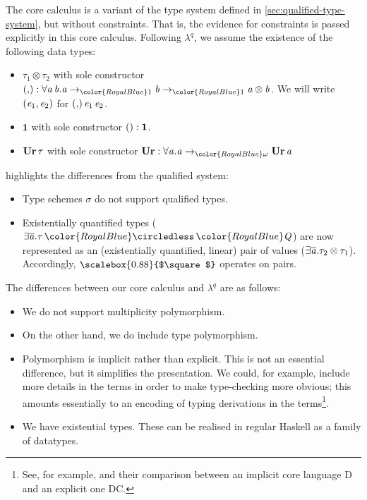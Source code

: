 \documentclass[acmsmall,usenames,dvipsnames,natbib=false,acmthm=false,screen]{acmart}
\newcommand{\constraintcolour}{\color{RoyalBlue}}
\newcommand{\constraintfont}[1]{{\constraintcolour#1}}
\newcommand{\multiplicitycolour}{\color{RoyalBlue}}
\newcommand{\multiplicityfont}[1]{{\multiplicitycolour#1}}
\newcommand{\RLolly}{\mathop{\constraintfont \circledless}}
\newcommand{\packbox}{\raisebox{-0.08ex}{\scalebox{0.88}{$\square$}}}
\theoremstyle{acmplain}
\theoremstyle{acmdefinition}
\begin{document}
The core calculus is a variant of the type system defined in
\cref{sec:qualified-type-system}, but without constraints. That is, the evidence for constraints is passed explicitly in this core calculus.
%
Following $λ^q$, we assume the existence of the following data types:
\begin{itemize}
\item $ \tau_{{\mathrm{1}}}  \otimes  \tau_{{\mathrm{2}}} $ with sole constructor
  $ ({,})   \ottsym{:}    \forall   \ottmv{a} \, \ottmv{b} .  \ottmv{a}   \to_{  \multiplicityfont{ \ottsym{1} }  }   \ottmv{b}  \to_{  \multiplicityfont{ \ottsym{1} }  }  \ottmv{a}    \otimes  \ottmv{b}$. We will write $(  \mathit{e_{{\mathrm{1}}}}  ,  \mathit{e_{{\mathrm{2}}}}  )$ for $  ({,})  \, \mathit{e_{{\mathrm{1}}}} \, \mathit{e_{{\mathrm{2}}}} $.
\item $  \mathbf{1}  $ with sole constructor $()  :   \mathbf{1} $.
\item $ \mathbf{Ur} \, \tau $ with sole constructor $\ottkw{Ur}  \ottsym{:}   \forall   \ottmv{a} .   \ottmv{a}  \to_{  \multiplicityfont{ \omega }  }  \ottkw{Ur} \, \ottmv{a}  $
\end{itemize}
%
highlights the differences from the qualified system:
\begin{itemize}
  \item Type schemes $ \sigma $ do not support qualified types.
  \item Existentially quantified types ($  \exists   \overline{\ottmv{a} } .  \tau  \RLolly   \constraintfont{ \ottnt{Q} }   $) are now represented as an (existentially quantified, linear) pair of values ($  \exists   \overline{\mathit{a} } .  \tau_{{\mathrm{2}}}  \otimes  \tau_{{\mathrm{1}}}  $).
Accordingly, $\packbox$ operates on pairs.
\end{itemize}
%
The differences between our core calculus and $λ^q$ are as follows:
\begin{itemize}
\item We do not support multiplicity polymorphism.
\item On the other hand, we do include type polymorphism.
\item Polymorphism is implicit rather than explicit. This is not an
  essential difference, but it simplifies the presentation. We could,
for example, include more details in the terms in order to make type-checking
more obvious; this amounts essentially to an encoding of typing derivations
in the terms\footnote{See, for example, \citet{weirich-icfp17} and their
comparison between an implicit core language D and an explicit one DC.}.
\item We have existential types. These can be realised in regular Haskell as a
  family of datatypes.
\end{itemize}
\end{document}
